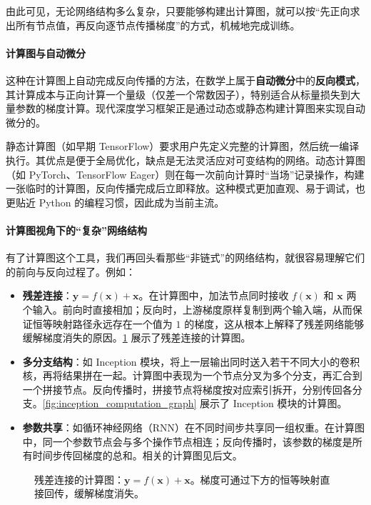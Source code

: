 由此可见，无论网络结构多么复杂，只要能够构建出计算图，就可以按“先正向求出所有节点值，再反向逐节点传播梯度”的方式，机械地完成训练。

\paragraph{计算图与自动微分}

这种在计算图上自动完成反向传播的方法，在数学上属于\textbf{自动微分}中的\textbf{反向模式}，其计算成本与正向计算一个量级（仅差一个常数因子），特别适合从标量损失到大量参数的梯度计算\cite{baydin2018automatic}。现代深度学习框架正是通过动态或静态构建计算图来实现自动微分的。

静态计算图（如早期 TensorFlow）要求用户先定义完整的计算图，然后统一编译执行。其优点是便于全局优化，缺点是无法灵活应对可变结构的网络。动态计算图（如 PyTorch、TensorFlow Eager）则在每一次前向计算时“当场”记录操作，构建一张临时的计算图，反向传播完成后立即释放。这种模式更加直观、易于调试，也更贴近 Python 的编程习惯，因此成为当前主流\cite{paszke2019pytorch,abadi2016tensorflow}。

\paragraph{计算图视角下的“复杂”网络结构}

有了计算图这个工具，我们再回头看那些“非链式”的网络结构，就很容易理解它们的前向与反向过程了。例如：
\begin{itemize}
    \item \textbf{残差连接}：$\mathbf{y} = f(\mathbf{x}) + \mathbf{x}$。在计算图中，加法节点同时接收 $f(\mathbf{x})$ 和 $\mathbf{x}$ 两个输入。前向时直接相加；反向时，上游梯度原样复制到两个输入端，从而保证恒等映射路径永远存在一个值为 $1$ 的梯度，这从根本上解释了残差网络能够缓解梯度消失的原因。\cref{fig:residual_computation_graph} 展示了残差连接的计算图。
    \item \textbf{多分支结构}：如 Inception 模块，将上一层输出同时送入若干不同大小的卷积核，再将结果拼在一起。计算图中表现为一个节点分叉为多个分支，再汇合到一个拼接节点。反向传播时，拼接节点将梯度按对应索引拆开，分别传回各分支。\cref{fig:inception_computation_graph} 展示了 Inception 模块的计算图。
    \item \textbf{参数共享}：如循环神经网络（RNN）在不同时间步共享同一组权重。在计算图中，同一个参数节点会与多个操作节点相连；反向传播时，该参数的梯度是所有时间步传回梯度的总和。相关的计算图见后文。
\end{itemize}

\begin{figure}
    \centering
    
    \caption{残差连接的计算图：$\mathbf{y} = f(\mathbf{x}) + \mathbf{x}$。梯度可通过下方的恒等映射直接回传，缓解梯度消失。}
    \label{fig:residual_computation_graph}
\end{figure}

